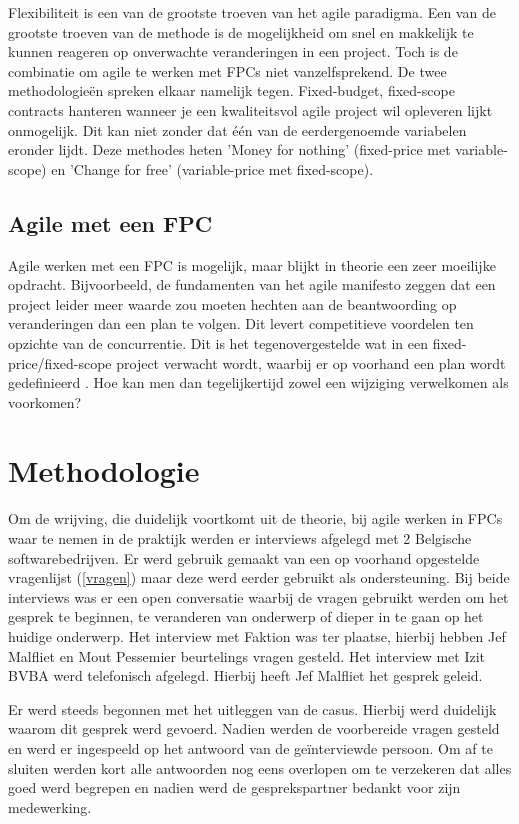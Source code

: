 \documentclass{hogent-article}
\begin{document}
    Flexibiliteit is een van de grootste troeven van het agile paradigma. Een van de grootste troeven van de methode is de mogelijkheid om snel en makkelijk te kunnen reageren op onverwachte veranderingen in een project. Toch is de combinatie om agile te werken met FPCs niet vanzelfsprekend. De twee methodologieën spreken elkaar namelijk tegen. Fixed-budget, fixed-scope contracts hanteren wanneer je een kwaliteitsvol agile project wil opleveren lijkt onmogelijk. Dit kan niet zonder dat één van de eerdergenoemde variabelen eronder lijdt. Deze methodes heten 'Money for nothing' (fixed-price met variable-scope) en 'Change for free' (variable-price met fixed-scope). 
    
    \subsection{Agile met een FPC}
    Agile werken met een FPC is mogelijk, maar blijkt in theorie een zeer moeilijke opdracht. Bijvoorbeeld, de fundamenten van het agile manifesto zeggen dat een project leider meer waarde zou moeten hechten aan de beantwoording op veranderingen dan een plan te volgen. Dit levert competitieve voordelen ten opzichte van de concurrentie. Dit is het tegenovergestelde wat in een fixed-price/fixed-scope project verwacht wordt, waarbij er op voorhand een plan wordt gedefinieerd \autocite{PMI2011}. Hoe kan men dan tegelijkertijd zowel een wijziging verwelkomen als voorkomen?
	
	
	\section{Methodologie}
	Om de wrijving, die duidelijk voortkomt uit de theorie, bij agile werken in FPCs waar te nemen in de praktijk werden er interviews afgelegd met 2 Belgische softwarebedrijven. Er werd gebruik gemaakt van een op voorhand opgestelde vragenlijst (\ref{vragen}) maar deze werd eerder gebruikt als ondersteuning. Bij beide interviews was er een open conversatie waarbij de vragen gebruikt werden om het gesprek te beginnen, te veranderen van onderwerp of dieper in te gaan op het huidige onderwerp. Het interview met Faktion was ter plaatse, hierbij hebben Jef Malfliet en Mout Pessemier beurtelings vragen gesteld. Het interview met Izit BVBA werd telefonisch afgelegd. Hierbij heeft Jef Malfliet het gesprek geleid.
	
	Er werd steeds begonnen met het uitleggen van de casus.  Hierbij werd duidelijk waarom dit gesprek werd gevoerd. Nadien werden de voorbereide vragen gesteld en werd er ingespeeld op het antwoord van de geïnterviewde persoon. Om af te sluiten werden kort alle antwoorden nog eens overlopen om te verzekeren dat alles goed werd begrepen en nadien werd de gesprekspartner bedankt voor zijn medewerking.
	
\end{document}
